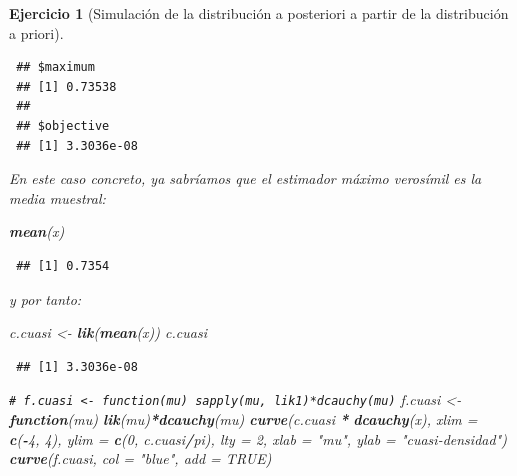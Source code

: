 \documentclass[
  spanish,
  10pt,
]{book}
\newenvironment{Shaded}{\begin{snugshade}}{\end{snugshade}}
\newcommand{\AttributeTok}[1]{\textcolor[rgb]{0.13,0.29,0.53}{#1}}
\newcommand{\CommentTok}[1]{\textcolor[rgb]{0.56,0.35,0.01}{\textit{#1}}}
\newcommand{\ConstantTok}[1]{\textcolor[rgb]{0.56,0.35,0.01}{#1}}
\newcommand{\ControlFlowTok}[1]{\textcolor[rgb]{0.13,0.29,0.53}{\textbf{#1}}}
\newcommand{\DecValTok}[1]{\textcolor[rgb]{0.00,0.00,0.81}{#1}}
\newcommand{\FunctionTok}[1]{\textcolor[rgb]{0.13,0.29,0.53}{\textbf{#1}}}
\newcommand{\NormalTok}[1]{#1}
\newcommand{\OtherTok}[1]{\textcolor[rgb]{0.56,0.35,0.01}{#1}}
\newcommand{\SpecialCharTok}[1]{\textcolor[rgb]{0.81,0.36,0.00}{\textbf{#1}}}
\newcommand{\StringTok}[1]{\textcolor[rgb]{0.31,0.60,0.02}{#1}}
\theoremstyle{break}
\newtheorem{exercise}{Ejercicio}[chapter]
\theoremstyle{nonumberplain}
\renewcommand{\CommentTok}[1]{\textcolor[rgb]{0.41,0.41,0.41}{\texttt{#1}}}
\begin{document}
\begin{exercise}[Simulación de la distribución a posteriori a partir de la distribución a priori]
\begin{enumerate}
\begin{verbatim}
 ## $maximum
 ## [1] 0.73538
 ## 
 ## $objective
 ## [1] 3.3036e-08
\end{verbatim}

\begin{Shaded}
\end{Shaded}

  En este caso concreto, ya sabríamos que el estimador máximo verosímil es la media muestral:

\begin{Shaded}
\begin{Highlighting}[]
\FunctionTok{mean}\NormalTok{(x)}
\end{Highlighting}
\end{Shaded}

\begin{verbatim}
 ## [1] 0.7354
\end{verbatim}

  y por tanto:

\begin{Shaded}
\begin{Highlighting}[]
\NormalTok{c.cuasi }\OtherTok{\textless{}{-}} \FunctionTok{lik}\NormalTok{(}\FunctionTok{mean}\NormalTok{(x))}
\NormalTok{c.cuasi   }
\end{Highlighting}
\end{Shaded}

\begin{verbatim}
 ## [1] 3.3036e-08
\end{verbatim}

\begin{Shaded}
\begin{Highlighting}[]
\CommentTok{\# f.cuasi \textless{}{-} function(mu) sapply(mu, lik1)*dcauchy(mu)}
\NormalTok{f.cuasi }\OtherTok{\textless{}{-}} \ControlFlowTok{function}\NormalTok{(mu) }\FunctionTok{lik}\NormalTok{(mu)}\SpecialCharTok{*}\FunctionTok{dcauchy}\NormalTok{(mu)    }
\FunctionTok{curve}\NormalTok{(c.cuasi }\SpecialCharTok{*} \FunctionTok{dcauchy}\NormalTok{(x), }\AttributeTok{xlim =} \FunctionTok{c}\NormalTok{(}\SpecialCharTok{{-}}\DecValTok{4}\NormalTok{, }\DecValTok{4}\NormalTok{), }\AttributeTok{ylim =} \FunctionTok{c}\NormalTok{(}\DecValTok{0}\NormalTok{, c.cuasi}\SpecialCharTok{/}\NormalTok{pi), }\AttributeTok{lty =} \DecValTok{2}\NormalTok{,}
      \AttributeTok{xlab =} \StringTok{"mu"}\NormalTok{, }\AttributeTok{ylab =} \StringTok{"cuasi{-}densidad"}\NormalTok{)}
\FunctionTok{curve}\NormalTok{(f.cuasi, }\AttributeTok{col =} \StringTok{"blue"}\NormalTok{, }\AttributeTok{add =} \ConstantTok{TRUE}\NormalTok{)}
\end{Highlighting}
\end{Shaded}


\end{enumerate}
\end{exercise}
\end{document}
